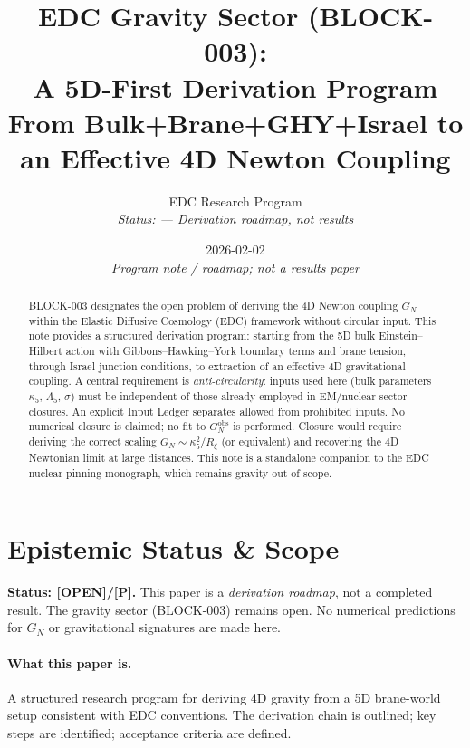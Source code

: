 \documentclass[11pt,a4paper]{article}
\title{\textbf{EDC Gravity Sector (BLOCK-003):}\\[0.3em]
A 5D-First Derivation Program\\[0.5em]
\large From Bulk+Brane+GHY+Israel to an Effective 4D Newton Coupling}
\author{EDC Research Program\\[0.3em]
\small\textit{Status: \tagOPEN{} --- Derivation roadmap, not results}}
\date{2026-02-02\\[0.3em]\small\textit{Program note / roadmap; not a results paper}}
\newcommand{\tagP}{\textcolor{orange!80!black}{[P]}}
\newcommand{\tagOPEN}{\textcolor{red!70!black}{[OPEN]}}
\begin{document}
\maketitle

\begin{abstract}
BLOCK-003 designates the open problem of deriving the 4D Newton coupling $G_N$ within the Elastic Diffusive Cosmology (EDC) framework without circular input.
This note provides a structured derivation program: starting from the 5D bulk Einstein--Hilbert action with Gibbons--Hawking--York boundary terms and brane tension, through Israel junction conditions, to extraction of an effective 4D gravitational coupling.
A central requirement is \emph{anti-circularity}: inputs used here (bulk parameters $\kappa_5$, $\Lambda_5$, $\sigma$) must be independent of those already employed in EM/nuclear sector closures.
An explicit Input Ledger separates allowed from prohibited inputs.
No numerical closure is claimed; no fit to $G_N^{\mathrm{obs}}$ is performed.
Closure would require deriving the correct scaling $G_N \sim \kappa_5^2 / R_\xi$ (or equivalent) and recovering the 4D Newtonian limit at large distances.
This note is a standalone companion to the EDC nuclear pinning monograph, which remains gravity-out-of-scope.
\end{abstract}

\section{Epistemic Status \& Scope}
\label{sec:epistemic}

\begin{statusbox}
\textbf{Status: \tagOPEN{}/\tagP{}.}
This paper is a \emph{derivation roadmap}, not a completed result.
The gravity sector (BLOCK-003) remains open.
No numerical predictions for $G_N$ or gravitational signatures are made here.
\end{statusbox}

\paragraph{What this paper is.}
A structured research program for deriving 4D gravity from a 5D brane-world setup consistent with EDC conventions.
The derivation chain is outlined; key steps are identified; acceptance criteria are defined.
\end{document}

